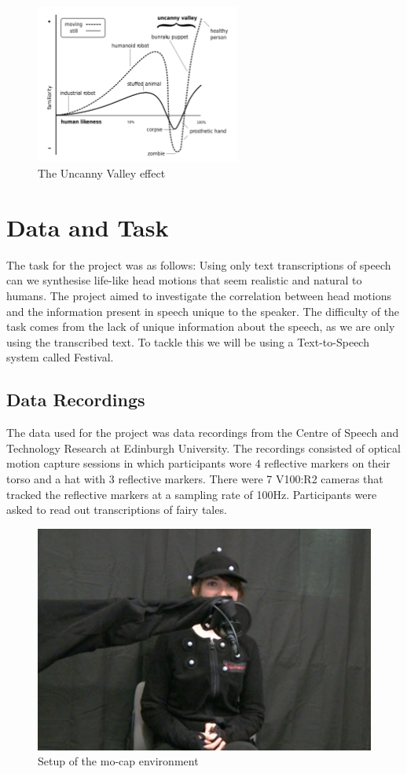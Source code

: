 \documentclass[bsc,frontabs,twoside,singlespacing,parskip]{infthesis}
\begin{document}
\begin{figure}[h!]
	\centering
	\includegraphics[width=0.6\textwidth]{uncanny}
	\caption{The Uncanny Valley effect}
\end{figure}

\section{Data and Task}

The task for the project was as follows: Using only text transcriptions of speech can we synthesise life-like head motions that seem realistic and natural to humans. The project aimed to investigate the correlation between head motions and the information present in speech unique to the speaker. The difficulty of the task comes from the lack of unique information about the speech, as we are only using the transcribed text. To tackle this we will be using a Text-to-Speech system called Festival.

\subsection{Data Recordings}

The data used for the project was data recordings from the Centre of Speech and Technology Research at Edinburgh University. The recordings consisted of optical motion capture sessions in which participants wore 4 reflective markers on their torso and a hat with 3 reflective markers. There were 7 V100:R2 cameras that tracked the reflective markers at a sampling rate of 100Hz. Participants were asked to read out transcriptions of fairy tales.

\begin{figure}[h!]
	\centering
	\includegraphics[width=.7\textwidth]{mocap.png}
	\caption{Setup of the mo-cap environment}
\end{figure}
\end{document}
